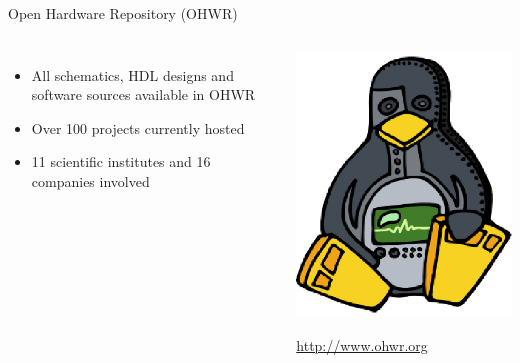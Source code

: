 \documentclass[compress,red]{beamer}
\begin{document}
\begin{frame}{Open Hardware Repository (OHWR)}
  \begin{columns}
    \begin{itemize}
      \item All schematics, HDL designs and software sources available in OHWR
      \item Over 100 projects currently hosted
      \item 11 scientific institutes and 16 companies involved
    \end{itemize}
    \begin{center}
      \includegraphics[width=\textwidth]{ohwr/ohr_logo.eps}
      \begin{block}{}
        \begin{center}
        \url{http://www.ohwr.org}
        \end{center}
      \end{block}
    \end{center}
  \end{columns}
\end{frame}
\end{document}
